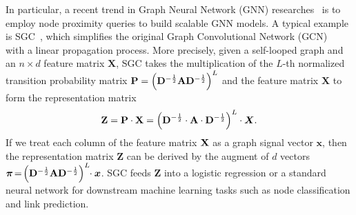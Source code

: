  
 
 
In particular, a recent trend in Graph Neural Network (GNN)  researches~\cite{wu2019SGC,klicpera2019GDC,Klicpera2018APPNP} is to employ node proximity queries to build scalable GNN models.
A typical example is SGC~\cite{wu2019SGC}, which simplifies the original Graph Convolutional Network (GCN)~\cite{kipf2016GCN} with a linear propagation process. More precisely, given a self-looped graph and an  $n \times d$ feature matrix $\mathbf{X}$, 
SGC takes the multiplication of the $L$-th normalized transition probability matrix $\P=\left(\mathbf{D}^{-\frac{1}{2}}  \mathbf{A}  \mathbf{D}^{-\frac{1}{2}} \right)^L$ and the feature matrix $\mathbf{X}$
to form the representation matrix %
\begin{equation}
\begin{aligned}\label{eqn:SGC}
\mathbf{Z}=\P \cdot \X= \left(\mathbf{D}^{-\frac{1}{2}} \cdot \mathbf{A} \cdot \mathbf{D}^{-\frac{1}{2}} \right)^L \cdot \vec{X}.
\end{aligned}	
\end{equation}
If we treat each column of the feature matrix $\X$ as a graph signal vector $\bm{x}$, then the representation matrix $\mathbf{Z}$ can be derived by the augment of $d$ vectors $\bm{\pi}\hspace{-0.5mm}= \hspace{-0.5mm}\left(\mathbf{D}^{-\frac{1}{2}} \mathbf{A}  \mathbf{D}^{-\frac{1}{2}} \right)^L \hspace{-1mm}\cdot \bm{x}$. SGC feeds $\mathbf{Z}$ into a logistic regression or a standard neural network for downstream machine learning tasks such as node classification and link prediction. 
